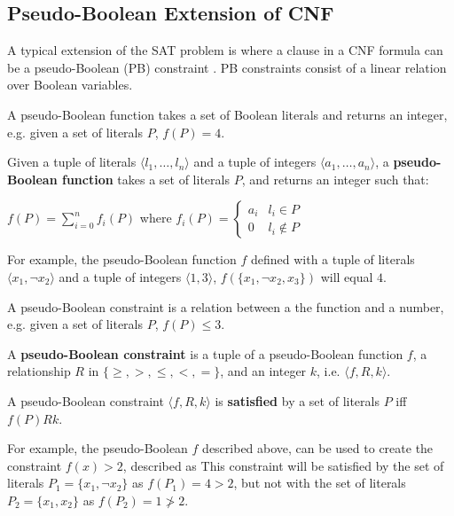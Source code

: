 \subsection{Pseudo-Boolean Extension of CNF}
A typical extension of the SAT problem is where a clause in a CNF formula can be a pseudo-Boolean (PB) constraint \citep{dixon2004automating}.
PB constraints consist of a linear relation over Boolean variables.

A pseudo-Boolean function takes a set of Boolean literals and returns an integer, e.g. given a set of literals $P$, $f(P) = 4$.
\begin{defs}
\label{impl.PBfunction}
Given a tuple of literals $\langle l_1,\ldots,l_n \rangle$ and a tuple of integers $\langle a_1,\ldots,a_n\rangle$,
a \textbf{pseudo-Boolean function} takes a set of literals $P$, and returns an integer such that:

$f(P) = \sum \limits_{i=0}^n f_i(P)$
where $f_i(P) = \begin{cases} a_i & l_i \in P \\ 0 & l_i \not \in P \end{cases}$
\end{defs}
For example, the pseudo-Boolean function $f$ defined with a tuple of literals $\langle x_1, \neg x_2\rangle$ and a tuple of integers $\langle 1,3\rangle$,
 $f(\{x_1,\neg x_2,x_3\})$ will equal $4$.

A pseudo-Boolean constraint is a relation between a the function and a number, e.g. given a set of literals $P$, $f(P) \leq 3$.
\begin{defs}
\label{impl.PBConstraint}
A \textbf{pseudo-Boolean constraint} is a tuple of a pseudo-Boolean function $f$, a relationship  $R$ in $\{\geq,>,\leq,<,=\}$, and an integer $k$, i.e. $\langle f,R,k\rangle$.
\end{defs}

\begin{defs}
A pseudo-Boolean constraint $\langle f,R,k\rangle$ is \textbf{satisfied} by a set of literals $P$ iff $ f(P) R k$.
\end{defs}
For example, the pseudo-Boolean $f$ described above, can be used to create the constraint $f(x) > 2$, described as 
This constraint will be satisfied by the set of literals $P_1 = \{ x_1, \neg x_2 \}$ as $f(P_1) = 4 > 2$, but not with the set of literals $P_2 = \{ x_1,  x_2 \}$ as $f(P_2) = 1 \not > 2$.

